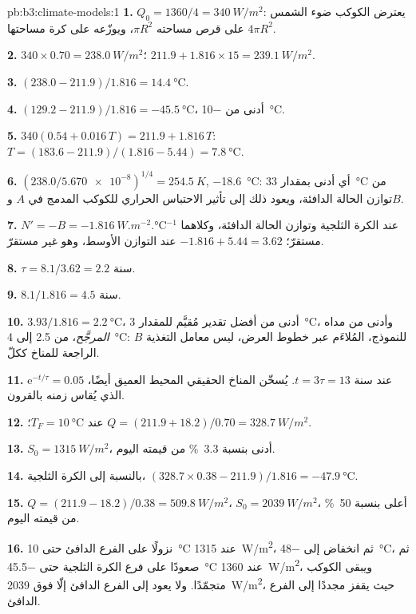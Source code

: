 \begin{solution}{pb:b3:climate-models:1}
\textbf{1.} $Q_0 = 1360/4 = \qty{340}{W/m^2}$: يعترض الكوكب
ضوء الشمس على قرص مساحته $\pi R^2$، ويوزّعه على كرة مساحتها
$4\pi R^2$.

\textbf{2.} $340\times0.70 = \qty{238.0}{W/m^2}$؛ $211.9 + 1.816\times15 =
\qty{239.1}{W/m^2}$.

\textbf{3.} $(238.0 - 211.9)/1.816 = \qty{14.4}{\celsius}$.

\textbf{4.} $(129.2 - 211.9)/1.816 = \qty{-45.5}{\celsius}$، أدنى من
\qty{-10}{\celsius}.

\textbf{5.} $340(0.54 + 0.016\,T) = 211.9 + 1.816\,T$: $T =
(183.6 - 211.9)/(1.816 - 5.44) = \qty{7.8}{\celsius}$.

\textbf{6.} $(238.0/\num{5.670e-8})^{1/4} = \qty{254.5}{K}$,
\qty{-18.6}{\celsius}: أي أدنى بمقدار \qty{33}{\celsius} من توازن الحالة الدافئة، ويعود ذلك إلى
تأثير الاحتباس الحراري للكوكب المدمج في $A$ و$B$.

\textbf{7.} $N' = -B = \qty{-1.816}{W.m^{-2}.\celsius^{-1}}$ عند
الكرة الثلجية وتوازن الحالة الدافئة، وكلاهما مستقرّ؛ $-1.816 + 5.44 =
\num{+3.62}$ عند التوازن الأوسط، وهو غير مستقرّ.

\textbf{8.} $\tau = 8.1/3.62 = \num{2.2}\text{ سنة}$.

\textbf{9.} $8.1/1.816 = \num{4.5}\text{ سنة}$.

\textbf{10.} $3.93/1.816 = \qty{2.2}{\celsius}$، أدنى من أفضل تقدير
مُقيَّم للمقدار \qty{3}{\celsius}، وأدنى من مداه \emph{المرجَّح}، من 2.5 إلى
\qty{4}{\celsius}: $B$ للنموذج، المُلاءَم عبر خطوط العرض، ليس
معامل التغذية الراجعة للمناخ ككلّ.

\textbf{11.} $\mathrm e^{-t/\tau} = 0.05$ عند $t = 3\tau =
\num{13}\text{ سنة}$. يُسخّن المناخ الحقيقي المحيط العميق أيضًا، الذي يُقاس زمنه
بالقرون.

\textbf{12.} عند $T_F = \qty{10}{\celsius}$؛ $Q = (211.9 + 18.2)/0.70 =
\qty{328.7}{W/m^2}$.

\textbf{13.} $S_0 = \qty{1315}{W/m^2}$، أدنى بنسبة \qty{3.3}{\percent} من قيمته اليوم.

\textbf{14.} بالنسبة إلى الكرة الثلجية، $(328.7\times0.38 - 211.9)/1.816 =
\qty{-47.9}{\celsius}$.

\textbf{15.} $Q = (211.9 - 18.2)/0.38 = \qty{509.8}{W/m^2}$، $S_0 =
\qty{2039}{W/m^2}$، أعلى بنسبة \qty{50}{\percent} من قيمته اليوم.

\textbf{16.} نزولًا على الفرع الدافئ حتى \qty{10}{\celsius} عند
\qty{1315}{W/m^2}، ثم انخفاض إلى \qty{-48}{\celsius}، ثم صعودًا على فرع الكرة الثلجية
حتى \qty{-45.5}{\celsius} عند \qty{1360}{W/m^2}، ويبقى الكوكب
متجمّدًا. ولا يعود إلى الفرع الدافئ إلّا فوق \qty{2039}{W/m^2}، حيث
يقفز مجددًا إلى الفرع الدافئ.


\end{solution}
